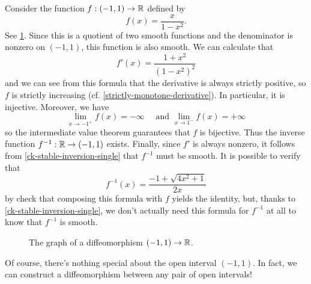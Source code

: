 \begin{example} \label{interval-to-line}
	Consider the function $f : (-1,1) \to \mathbb{R}$ defined by \[ f(x) = \frac{x}{1-x^2}. \]
	See \cref{interval-to-line-graph}. 
	Since this is a quotient of two smooth functions and the denominator is nonzero on $(-1,1)$, this function is also smooth. We can calculate that
	\[ f'(x) = \frac{1+x^2}{(1-x^2)^2} \]
	and we can see from this formula that the derivative is always strictly positive, so $f$ is strictly increasing (cf. \cref{strictly-monotone-derivative}). In particular, it is injective. Moreover, we have
	\[ \lim_{x \to -1^+} f(x) = -\infty \quad \text{ and } \lim_{x \to 1^-} f(x) = +\infty \]
	so the intermediate value theorem guarantees that $f$ is bijective. Thus the inverse function $f^{-1} : \mathbb{R} \to (-1,1)$ exists. Finally, since $f'$ is always nonzero, it follows from \cref{ck-stable-inversion-single} that $f^{-1}$ must be smooth. It is possible to verify that
	\[ f^{-1}(x) = \frac{-1+\sqrt{4x^2+1}}{2x} \]
	by check that composing this formula with $f$ yields the identity, but, thanks to \cref{ck-stable-inversion-single}, we don't actually need this formula for $f^{-1}$ at all to know that $f^{-1}$ is smooth.
\end{example}


\begin{figure}
	\begin{center}
	\end{center}
	\caption{The graph of a diffeomorphism $(-1,1) \to \mathbb{R}$.}  \label{interval-to-line-graph}
\end{figure}

Of course, there's nothing special about the open interval $(-1,1)$. In fact, we can construct a diffeomorphism between any pair of open intervals!

